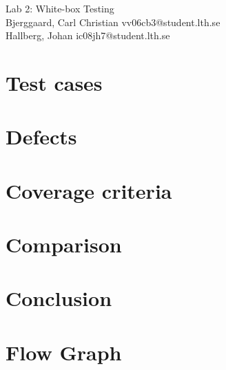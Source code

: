 \documentclass[titlepage]{article}
\begin{document}
\begin{center}
	\huge{Lab 2: White-box Testing } \\
	\small{Bjerggaard, Carl Christian vv06cb3@student.lth.se \\Hallberg, Johan ic08jh7@student.lth.se}

\vspace*{1cm}

\end{center}

\thispagestyle{empty}

\clearpage
\section{Test cases}
\label{testcases}



\section{Defects}
\label{defects}


\section{Coverage criteria}
\label{coverage}


\section{Comparison}
\label{comparison}


\section{Conclusion}
\label{conclusion}


\section{Flow Graph}
\label{flowgraph}

\end{document}
